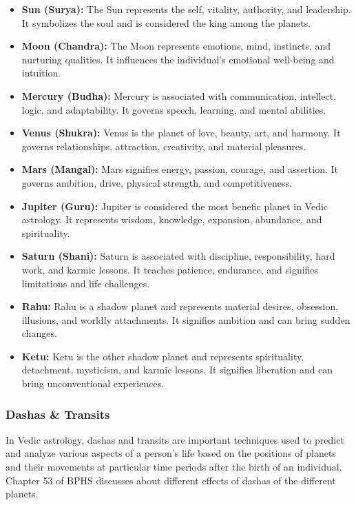 \begin{itemize}
	\item \textbf{Sun (Surya):} The Sun represents the self, vitality, authority, and leadership. It symbolizes the soul and is considered the king among the planets.
	\item \textbf{Moon (Chandra):} The Moon represents emotions, mind, instincts, and nurturing qualities. It influences the individual's emotional well-being and intuition.
	\item \textbf{Mercury (Budha):} Mercury is associated with communication, intellect, logic, and adaptability. It governs speech, learning, and mental abilities.
	\item \textbf{Venus (Shukra):} Venus is the planet of love, beauty, art, and harmony. It governs relationships, attraction, creativity, and material pleasures.
	\item \textbf{Mars (Mangal):} Mars signifies energy, passion, courage, and assertion. It governs ambition, drive, physical strength, and competitiveness.
	\item \textbf{Jupiter (Guru):} Jupiter is considered the most benefic planet in Vedic astrology. It represents wisdom, knowledge, expansion, abundance, and spirituality.
	\item \textbf{Saturn (Shani):} Saturn is associated with discipline, responsibility, hard work, and karmic lessons. It teaches patience, endurance, and signifies limitations and life challenges.
	\item \textbf{Rahu:} Rahu is a shadow planet and represents material desires, obsession, illusions, and worldly attachments. It signifies ambition and can bring sudden changes.
	\item \textbf{Ketu:} Ketu is the other shadow planet and represents spirituality, detachment, mysticism, and karmic lessons. It signifies liberation and can bring unconventional experiences.
\end{itemize}

\subsubsection{Dashas \& Transits}
In Vedic astrology, dashas and transits are important techniques used to predict and analyze various aspects of a person's life based on the positions of planets and their movements at particular time periods after the birth of an individual. Chapter 53 of BPHS\cite{BrihatParasharHoraShastraVol1, BrihatParasharHoraShastraVol2, wiki:bphs} discusses about different effects of dashas of the different planets.


